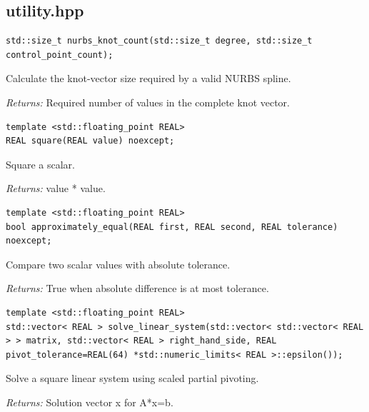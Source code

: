 \subsection{utility.hpp}
\par\noindent\begin{minipage}{\linewidth}
\begin{lstlisting}[style=apireference]
std::size_t nurbs_knot_count(std::size_t degree, std::size_t control_point_count);
\end{lstlisting}
{\footnotesize Calculate the knot-vector size required by a valid NURBS spline.\par}
{\footnotesize\textit{Returns:} Required number of values in the complete knot vector.\par}
\end{minipage}\par\vspace{1pt}
\par\noindent\begin{minipage}{\linewidth}
\begin{lstlisting}[style=apireference]
template <std::floating_point REAL>
REAL square(REAL value) noexcept;
\end{lstlisting}
{\footnotesize Square a scalar.\par}
{\footnotesize\textit{Returns:} value * value.\par}
\end{minipage}\par\vspace{1pt}
\par\noindent\begin{minipage}{\linewidth}
\begin{lstlisting}[style=apireference]
template <std::floating_point REAL>
bool approximately_equal(REAL first, REAL second, REAL tolerance) noexcept;
\end{lstlisting}
{\footnotesize Compare two scalar values with absolute tolerance.\par}
{\footnotesize\textit{Returns:} True when absolute difference is at most tolerance.\par}
\end{minipage}\par\vspace{1pt}
\par\noindent\begin{minipage}{\linewidth}
\begin{lstlisting}[style=apireference]
template <std::floating_point REAL>
std::vector< REAL > solve_linear_system(std::vector< std::vector< REAL > > matrix, std::vector< REAL > right_hand_side, REAL pivot_tolerance=REAL(64) *std::numeric_limits< REAL >::epsilon());
\end{lstlisting}
{\footnotesize Solve a square linear system using scaled partial pivoting.\par}
{\footnotesize\textit{Returns:} Solution vector x for A*x=b.\par}
\end{minipage}\par\vspace{1pt}

